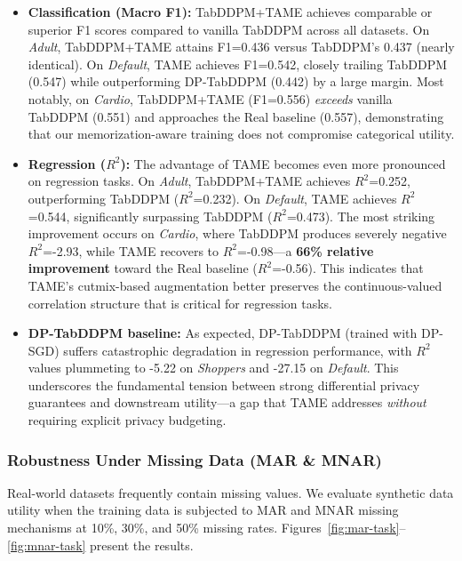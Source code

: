 \begin{itemize}
    \item \textbf{Classification (Macro F1):} TabDDPM+TAME achieves comparable or superior F1 scores compared to vanilla TabDDPM across all datasets. On \textit{Adult}, TabDDPM+TAME attains F1=0.436 versus TabDDPM's 0.437 (nearly identical). On \textit{Default}, TAME achieves F1=0.542, closely trailing TabDDPM (0.547) while outperforming DP-TabDDPM (0.442) by a large margin. Most notably, on \textit{Cardio}, TabDDPM+TAME (F1=0.556) \emph{exceeds} vanilla TabDDPM (0.551) and approaches the Real baseline (0.557), demonstrating that our memorization-aware training does not compromise categorical utility.

    \item \textbf{Regression ($R^2$):} The advantage of TAME becomes even more pronounced on regression tasks. On \textit{Adult}, TabDDPM+TAME achieves $R^2$=0.252, outperforming TabDDPM ($R^2$=0.232). On \textit{Default}, TAME achieves $R^2$=0.544, significantly surpassing TabDDPM ($R^2$=0.473). The most striking improvement occurs on \textit{Cardio}, where TabDDPM produces severely negative $R^2$=-2.93, while TAME recovers to $R^2$=-0.98---a \textbf{66\% relative improvement} toward the Real baseline ($R^2$=-0.56). This indicates that TAME's cutmix-based augmentation better preserves the continuous-valued correlation structure that is critical for regression tasks.

    \item \textbf{DP-TabDDPM baseline:} As expected, DP-TabDDPM (trained with DP-SGD) suffers catastrophic degradation in regression performance, with $R^2$ values plummeting to -5.22 on \textit{Shoppers} and -27.15 on \textit{Default}. This underscores the fundamental tension between strong differential privacy guarantees and downstream utility---a gap that TAME addresses \emph{without} requiring explicit privacy budgeting.
\end{itemize}

\subsubsection{Robustness Under Missing Data (MAR \& MNAR)}

Real-world datasets frequently contain missing values. We evaluate synthetic data utility when the training data is subjected to MAR and MNAR missing mechanisms at 10\%, 30\%, and 50\% missing rates. Figures~\ref{fig:mar-task}--\ref{fig:mnar-task} present the results.

